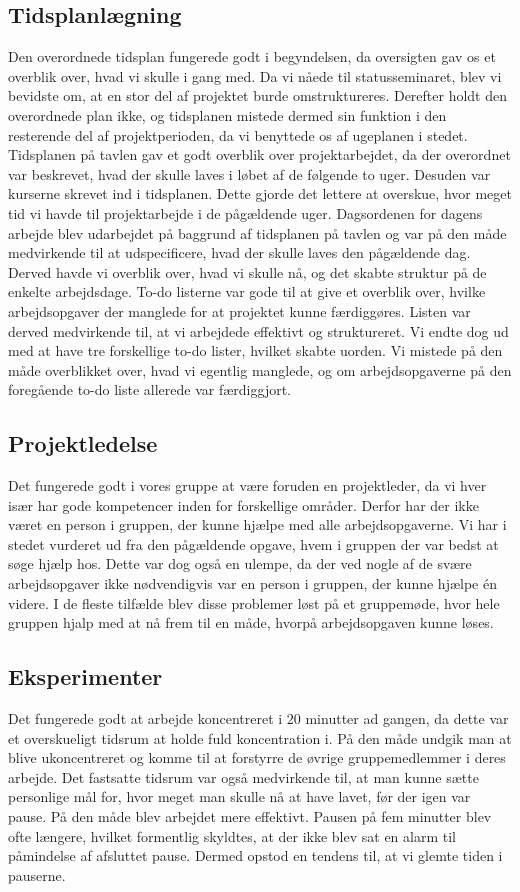 \subsection{Tidsplanlægning}
Den overordnede tidsplan fungerede godt i begyndelsen, da oversigten gav os et overblik over, hvad vi skulle i gang med. Da vi nåede til statusseminaret, blev vi bevidste om, at en stor del af projektet burde omstruktureres. Derefter holdt den overordnede plan ikke, og tidsplanen mistede dermed sin funktion i den resterende del af projektperioden, da vi benyttede os af ugeplanen i stedet.
Tidsplanen på tavlen gav et godt overblik over projektarbejdet, da der overordnet var beskrevet, hvad der skulle laves i løbet af de følgende to uger. Desuden var kurserne skrevet ind i tidsplanen. Dette gjorde det lettere at overskue, hvor meget tid vi havde til projektarbejde i de pågældende uger. 
Dagsordenen for dagens arbejde blev udarbejdet på baggrund af tidsplanen på tavlen og var på den måde medvirkende til at udspecificere, hvad der skulle laves den pågældende dag. Derved havde vi overblik over, hvad vi skulle nå, og det skabte struktur på de enkelte arbejdsdage.
To-do listerne var gode til at give et overblik over, hvilke arbejdsopgaver der manglede for at projektet kunne færdiggøres. Listen var derved medvirkende til, at vi arbejdede effektivt og struktureret. Vi endte dog ud med at have tre forskellige to-do lister, hvilket skabte uorden. Vi mistede på den måde overblikket over, hvad vi egentlig manglede, og om arbejdsopgaverne på den foregående to-do liste allerede var færdiggjort.

\subsection{Projektledelse}
Det fungerede godt i vores gruppe at være foruden en projektleder, da vi hver især har gode kompetencer inden for forskellige områder. Derfor har der ikke været en person i gruppen, der kunne hjælpe med alle arbejdsopgaverne. Vi har i stedet vurderet ud fra den pågældende opgave, hvem i gruppen der var bedst at søge hjælp hos. Dette var dog også en ulempe, da der ved nogle af de svære arbejdsopgaver ikke nødvendigvis var en person i gruppen, der kunne hjælpe én videre. I de fleste tilfælde blev disse problemer løst på et gruppemøde, hvor hele gruppen hjalp med at nå frem til en måde, hvorpå arbejdsopgaven kunne løses.

\subsection{Eksperimenter}
Det fungerede godt at arbejde koncentreret i $20$ minutter ad gangen, da dette var et overskueligt tidsrum at holde fuld koncentration i. På den måde undgik man at blive ukoncentreret og komme til at forstyrre de øvrige gruppemedlemmer i deres arbejde. Det fastsatte tidsrum var også medvirkende til, at man kunne sætte personlige mål for, hvor meget man skulle nå at have lavet, før der igen var pause. På den måde blev arbejdet mere effektivt. 
Pausen på fem minutter blev ofte længere, hvilket formentlig skyldtes, at der ikke blev sat en alarm til påmindelse af afsluttet pause. Dermed opstod en tendens til, at vi glemte tiden i pauserne. 

